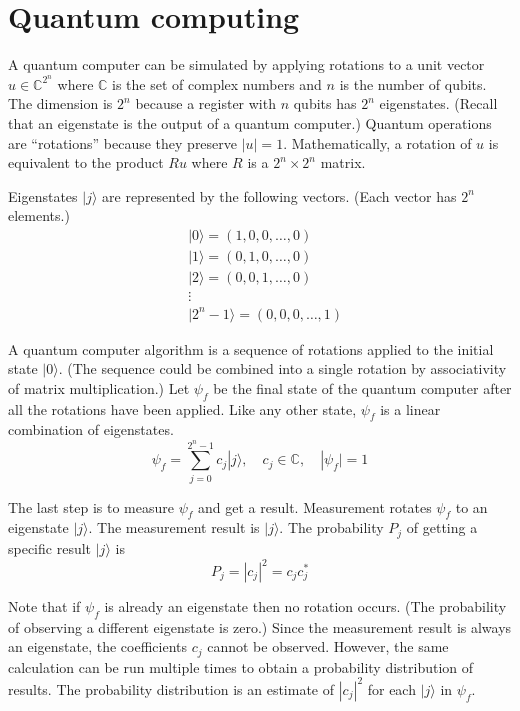 
\newpage

\section{Quantum computing}

A quantum computer can be simulated by applying rotations to a
unit vector
$u\in\mathbb{C}^{2^n}$ where $\mathbb{C}$ is the set of complex numbers
and $n$ is the number of qubits.
The dimension is $2^n$ because a register with $n$ qubits
has $2^n$ eigenstates.
(Recall that an eigenstate is the output of a quantum computer.)
Quantum operations are ``rotations'' because they preserve $|u|=1$.
Mathematically, a rotation of $u$ is equivalent to the product $Ru$
where $R$ is a $2^n\times2^n$ matrix.

\bigskip
Eigenstates $|j\rangle$ are represented by the following vectors.
(Each vector has $2^n$ elements.)
\begin{align*}
&|0\rangle=(1,0,0,\dots,0)
\\
&|1\rangle=(0,1,0,\ldots,0)
\\
&|2\rangle=(0,0,1,\ldots,0)
\\
&\vdots
\\
&|2^n-1\rangle=(0,0,0,\ldots,1)
\end{align*}

A quantum computer algorithm is a sequence of rotations
applied to the initial state $|0\rangle$.
(The sequence could be combined into a single rotation
by associativity of matrix multiplication.)
Let $\psi_f$ be the final state of the quantum computer
after all the rotations have been applied.
Like any other state, $\psi_f$ is a linear combination of eigenstates.
\begin{equation*}
\psi_f=\sum_{j=0}^{2^n-1}c_j|j\rangle,
\quad
c_j\in\mathbb C,
\quad
|\psi_f|=1
\end{equation*}

The last step is to measure $\psi_f$ and get a result.
Measurement rotates $\psi_f$ to an eigenstate $|j\rangle$.
The measurement result is $|j\rangle$.
The probability $P_j$ of getting a specific result $|j\rangle$ is
\begin{equation*}
P_j=|c_j|^2=c_jc_j^*
\end{equation*}

Note that if $\psi_f$ is already an eigenstate then no rotation occurs.
(The probability of observing a different eigenstate is zero.)
Since the measurement result is always an eigenstate,
the coefficients $c_j$ cannot be observed.
However, the same calculation can be run multiple times
to obtain a probability distribution of results.
The probability distribution is an estimate
of $|c_j|^2$ for each $|j\rangle$ in $\psi_f$.

